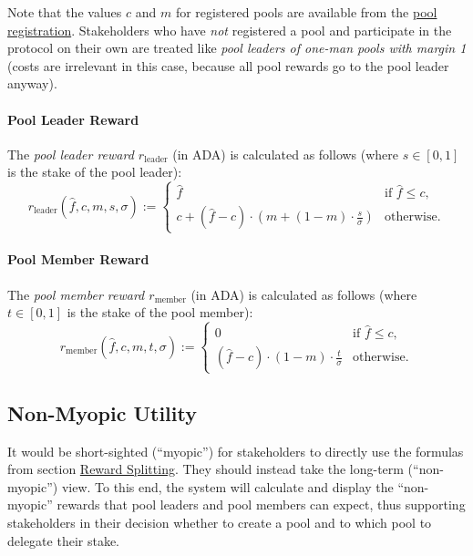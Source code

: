 \documentclass[11pt,a4paper]{article}
\begin{document}
Note that the values \(c\) and \(m\) for registered pools are available
from the \hyperref[stake-pool-registration]{pool registration}.
Stakeholders who have \emph{not} registered a pool and participate in
the protocol on their own are treated like \emph{pool leaders of one-man
pools with margin 1} (costs are irrelevant in this case, because all
pool rewards go to the pool leader anyway).

\paragraph{Pool Leader Reward}
\label{pool-leader-reward}

The \emph{pool leader reward \(r_\mathrm{leader}\)} (in ADA) is
calculated as follows (where \(s\in[0,1]\) is the stake of the pool
leader): \[
    r_\mathrm{leader}(\hat{f}, c, m, s, \sigma) :=
    \left\{
    \begin{array}{ll}
        \displaystyle\hat{f} &
        \text{if $\hat{f}\leq c$,} \\
        \displaystyle c + (\hat{f} - c)\cdot\left(m + (1-m)\cdot\frac{s}{\sigma}\right) &
        \text{otherwise.}
    \end{array}
    \right.
\]

\paragraph{Pool Member Reward}
\label{pool-member-reward}

The \emph{pool member reward \(r_\mathrm{member}\)} (in ADA) is
calculated as follows (where \(t\in[0,1]\) is the stake of the pool
member): \[
    r_\mathrm{member}(\hat{f}, c, m, t, \sigma) :=
    \left\{
    \begin{array}{ll}
        \displaystyle 0 &
        \text{if $\hat{f}\leq c$,} \\
        \displaystyle (\hat{f} - c)\cdot(1-m)\cdot\frac{t}{\sigma} &
        \text{otherwise.}
    \end{array}
    \right.
\]

\subsection{Non-Myopic Utility}
\label{non-myopic-utility}

It would be short-sighted (``myopic'') for stakeholders to directly use
the formulas from section \hyperref[reward-splitting]{Reward Splitting}.
They should instead take the long-term (``non-myopic'') view. To this
end, the system will calculate and display the ``non-myopic'' rewards
that pool leaders and pool members can expect, thus supporting
stakeholders in their decision whether to create a pool and to which
pool to delegate their stake.
\end{document}
